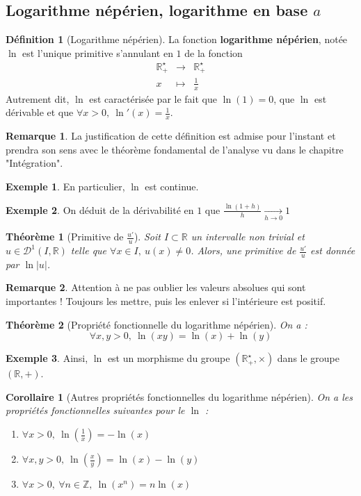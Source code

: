 \documentclass[french]{book}
\newcommand{\Z}{\mathbb{Z}}
\newcommand{\R}{\mathbb{R}}
\newcommand{\st}{^\star}
\theoremstyle{plain}
\newtheorem{thm}{Théorème}[chapter]
\newtheorem{cor}{Corollaire}[chapter]
\theoremstyle{definition}
\newtheorem{dfn}{Définition}[chapter]
\newtheorem{exa}{Exemple}[chapter]
\newtheorem{rmq}{Remarque}[chapter]
\theoremstyle{remark}
\begin{document}
\subsection{Logarithme népérien, logarithme en base $a$}
\begin{dfn}[Logarithme népérien]
	La fonction \textbf{logarithme népérien}, notée $\ln$ est l'unique primitive s'annulant en $1$ de la fonction $$\begin{array}{ccc}\R_+\st&\rightarrow&\R_+\st\\x&\mapsto&\displaystyle\frac{1}{x}\end{array}$$ Autrement dit, $\ln$ est caractérisée par le fait que $\ln(1)=0$, que $\ln$ est dérivable et que $\forall x>0,\ \displaystyle \ln'(x)=\frac1x$.
\end{dfn}
\begin{rmq}
	La justification de cette définition est admise pour l'instant et prendra son sens avec le théorème fondamental de l'analyse vu dans le chapitre "Intégration".
\end{rmq}
\begin{exa}
	En particulier, $\ln$ est continue.
\end{exa}
\begin{exa}
	On déduit de la dérivabilité en $1$ que $\displaystyle \frac{\ln(1+h)}{h}\xrightarrow[h\to 0]{}1$
\end{exa}
\begin{thm}[Primitive de $\displaystyle\frac{u'}{u}$]
	Soit $I\subset\R$ un intervalle non trivial et $u\in\mathcal{D}^1(I,\R)$ telle que $\forall x\in I,\ u(x)\ne0$. Alors, une primitive de $\displaystyle\frac{u'}{u}$ est donnée par $\ln\lvert u\rvert$.
\end{thm}
\begin{rmq}
	Attention à ne pas oublier les valeurs absolues qui sont importantes ! Toujours les mettre, puis les enlever si l'intérieure est positif.
\end{rmq}
\begin{thm}[Propriété fonctionnelle du logarithme népérien]
	On a : $$\forall x,y>0,\ \ln(xy)=\ln(x)+\ln(y)$$
\end{thm}
\begin{exa}
	Ainsi, $\ln$ est un morphisme du groupe $(\R_+\st,\times)$ dans le groupe $(\R,+)$.
\end{exa}
\begin{cor}[Autres propriétés fonctionnelles du logarithme népérien]
	On a les propriétés fonctionnelles suivantes pour le $\ln$ : 
	\begin{enumerate}
		\item $\forall x>0,\ \ln\left(\frac1x\right)=-\ln(x)$
		\item $\forall x,y>0,\ \ln\left(\frac{x}{y}\right)=\ln(x)-\ln(y)$
		\item $\forall x>0,\ \forall n\in\Z,\ \ln(x^n)=n\ln(x)$
	\end{enumerate}
\end{cor}
\end{document}
